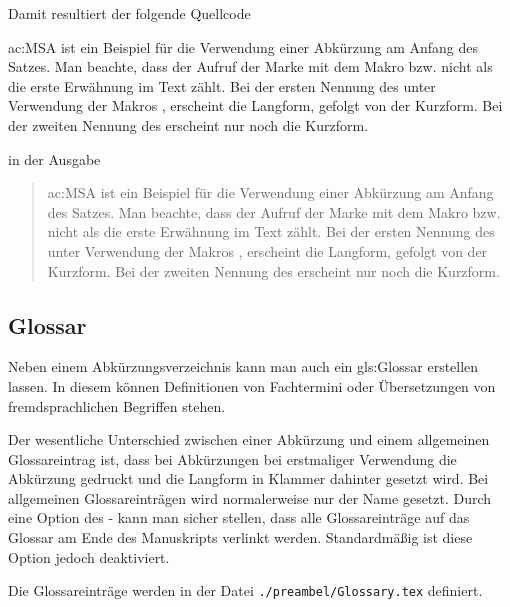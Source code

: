 Damit resultiert der folgende Quellcode
\begin{latex}[caption={Verwendung von Abkürzungen},label={lst:AcronymUsage}]
    \Acf{ac:MSA} ist ein Beispiel für die Verwendung einer
    Abkürzung am Anfang des Satzes. Man beachte, dass
    der Aufruf der Marke mit dem Makro  bzw. 
    nicht als die erste Erwähnung im Text zählt.
    Bei der ersten Nennung des  unter Verwendung
    der Makros ,  \oae erscheint die Langform,
    gefolgt von der Kurzform. Bei der zweiten Nennung des
     erscheint nur noch die Kurzform.
\end{latex}
%
in der Ausgabe
%
\begin{quote}
\Acf{ac:MSA} ist ein Beispiel für die Verwendung einer
Abkürzung am Anfang des Satzes. Man beachte, dass
der Aufruf der Marke mit dem Makro  bzw. 
nicht als die erste Erwähnung im Text zählt.
Bei der ersten Nennung des  unter Verwendung
der Makros ,  \oae erscheint die Langform,
gefolgt von der Kurzform. Bei der zweiten Nennung des
 erscheint nur noch die Kurzform.
\end{quote}


\subsection{Glossar}%
\label{sec:Glossar}

Neben einem Abkürzungsverzeichnis kann man auch ein
\gls{gls:Glossar} erstellen lassen.
In diesem können Definitionen von Fachtermini oder
Übersetzungen von fremdsprachlichen Begriffen stehen.

Der wesentliche Unterschied zwischen einer Abkürzung und einem allgemeinen Glossareintrag ist,
dass bei Abkürzungen bei erstmaliger Verwendung die Abkürzung gedruckt und die Langform in Klammer dahinter gesetzt wird.
Bei allgemeinen Glossareinträgen wird normalerweise nur der Name gesetzt.
Durch eine Option des - kann man sicher stellen,
dass alle Glossareinträge auf das Glossar am Ende des Manuskripts verlinkt werden.
Standardmäßig ist diese Option jedoch deaktiviert.

Die Glossareinträge werden in der Datei  \texttt{./preambel/Glossary.tex} definiert.


